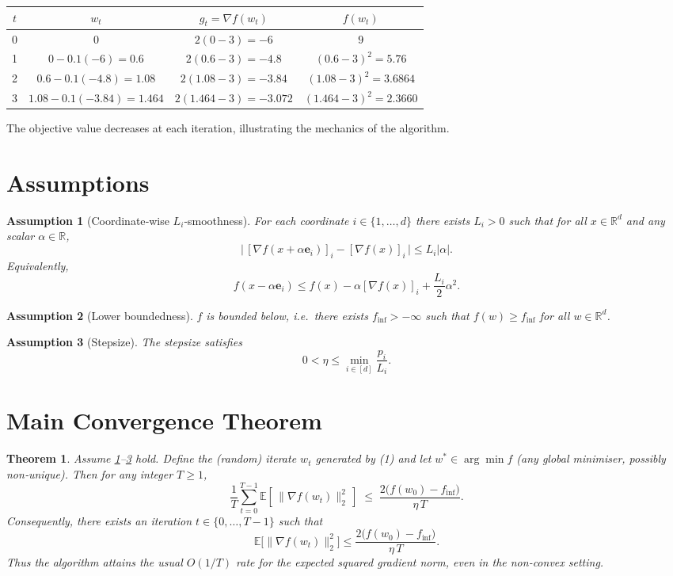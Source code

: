 \documentclass{article}
\newtheorem{theorem}{Theorem}
\newtheorem{assumption}{Assumption}
\newcommand{\EE}{\mathbb{E}}
\newcommand{\R}{\mathbb{R}}
\newcommand{\e}{\mathbf{e}}
\begin{document}
\begin{center}
\begin{tabular}{c|c|c|c}
$t$ & $w_t$ & $g_t=\nabla f(w_t)$ & $f(w_t)$ \\ \hline
0 & $0$ & $2(0-3)=-6$ & $9$ \\
1 & $0-0.1(-6)=0.6$ & $2(0.6-3)=-4.8$ & $(0.6-3)^2=5.76$ \\
2 & $0.6-0.1(-4.8)=1.08$ & $2(1.08-3)=-3.84$ & $(1.08-3)^2=3.6864$ \\
3 & $1.08-0.1(-3.84)=1.464$ & $2(1.464-3)=-3.072$ & $(1.464-3)^2=2.3660$
\end{tabular}
\end{center}
The objective value decreases at each iteration, illustrating the
mechanics of the algorithm.

\section*{Assumptions}
\begin{assumption}[Coordinate‑wise $L_i$‑smoothness]\label{ass:smooth}
For each coordinate $i\in\{1,\dots ,d\}$ there exists $L_i>0$ such that
for all $x\in\R^{d}$ and any scalar $\alpha\in\R$,
\[
\bigl|\,[\nabla f(x+\alpha \e_i)]_i-[\nabla f(x)]_i\,\bigr|
\le L_i|\alpha|.
\tag{2}
\]
Equivalently,
\[
f(x-\alpha \e_i)\le f(x)-\alpha [\nabla f(x)]_i
+\frac{L_i}{2}\alpha^2 .
\tag{3}
\]
\end{assumption}

\begin{assumption}[Lower boundedness]\label{ass:lb}
$f$ is bounded below, i.e.\ there exists $f_{\inf}>-\infty$ such that
$f(w)\ge f_{\inf}$ for all $w\in\R^{d}$.
\end{assumption}

\begin{assumption}[Stepsize]\label{ass:stepsize}
The stepsize satisfies
\[
0<\eta\le \min_{i\in[d]}\frac{p_i}{L_i}.
\tag{4}
\]
\end{assumption}

\section*{Main Convergence Theorem}
\begin{theorem}\label{thm:main}
Assume \ref{ass:smooth}--\ref{ass:stepsize} hold.
Define the (random) iterate $w_t$ generated by (1) and let
$w^{*}\in\arg\min f$ (any global minimiser, possibly non‑unique).
Then for any integer $T\ge 1$,
\[
\frac{1}{T}\sum_{t=0}^{T-1}\EE\!\left[\,
\bigl\|\nabla f(w_t)\bigr\|_{2}^{2}\,\right]
\;\le\;
\frac{2\bigl(f(w_0)-f_{\inf}\bigr)}{\eta\,T}.
\tag{5}
\]
Consequently, there exists an iteration $t\in\{0,\dots ,T-1\}$ such that
\[
\EE\!\bigl[\|\nabla f(w_t)\|_{2}^{2}\bigr]
\le \frac{2\bigl(f(w_0)-f_{\inf}\bigr)}{\eta\,T}.
\]
Thus the algorithm attains the usual $O(1/T)$ rate for the
expected squared gradient norm, even in the non‑convex setting.
\end{theorem}
\end{document}

